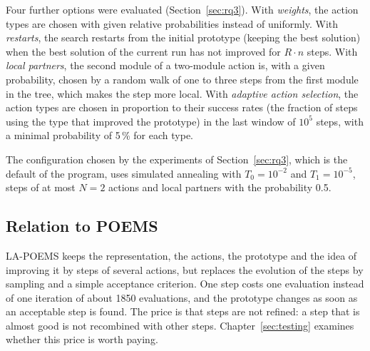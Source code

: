 Four further options were evaluated (Section~\ref{sec:rq3}). With {\em weights}, the action types are chosen with given relative probabilities instead of uniformly. With {\em restarts}, the search restarts from the initial prototype (keeping the best solution) when the best solution of the current run has not improved for $R \cdot n$ steps. With {\em local partners}, the second module of a two-module action is, with a given probability, chosen by a random walk of one to three steps from the first module in the tree, which makes the step more local. With {\em adaptive action selection}, the action types are chosen in proportion to their success rates (the fraction of steps using the type that improved the prototype) in the last window of $10^5$ steps, with a minimal probability of 5\,\% for each type.

The configuration chosen by the experiments of Section~\ref{sec:rq3}, which is the default of the program, uses simulated annealing with $T_0 = 10^{-2}$ and $T_1 = 10^{-5}$, steps of at most $N = 2$ actions and local partners with the probability 0.5.

\subsection{Relation to POEMS}

LA-POEMS keeps the representation, the actions, the prototype and the idea of improving it by steps of several actions, but replaces the evolution of the steps by sampling and a simple acceptance criterion. One step costs one evaluation instead of one iteration of about 1850 evaluations, and the prototype changes as soon as an acceptable step is found. The price is that steps are not refined: a step that is almost good is not recombined with other steps. Chapter~\ref{sec:testing} examines whether this price is worth paying.

